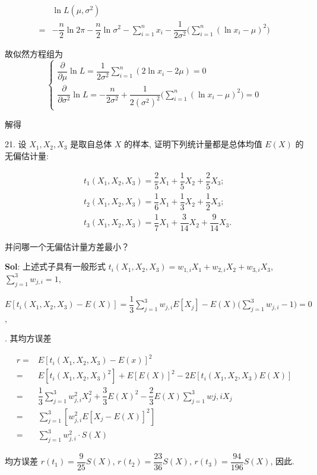 $$
\begin{aligned}
    &\ln L(\mu,\sigma^2)\\
    =&-\dfrac{n}{2}\ln2\pi-\dfrac{n}{2}\ln\sigma^2-\sum_{i=1}^nx_i-\dfrac{1}{2\sigma^2}\Big(\sum_{i=1}^n(\ln x_i-\mu)^2\Big)
\end{aligned}
$$

故似然方程组为
$$
\begin{cases}
\displaystyle
    \dfrac{\partial}{\partial \mu }\ln L=\dfrac{1}{2\sigma^2}\sum_{i=1}^n(2\ln x_i-2\mu)=0\\
\displaystyle
    \dfrac{\partial}{\partial \sigma^2}\ln L=-\dfrac{n}{2\sigma^2}+\dfrac{1}{2(\sigma^2)^2}\Big(\sum_{i=1}^n(\ln x_i-\mu)^2\Big)=0
\end{cases}
$$

解得 

\vspace{12pt}

21. 设 $X_1,X_2,X_3$ 是取自总体 $X$ 的样本, 证明下列统计量都是总体均值 $E(X)$ 的无偏估计量:

$$
\begin{aligned}
    &t_1(X_1,X_2,X_3)=\dfrac{2}{5}X_1+\dfrac{1}{5}X_2+\dfrac{2}{5}X_3;\\
    &t_2(X_1,X_2,X_3)=\dfrac{1}{6}X_1+\dfrac{1}{3}X_2+\dfrac{1}{2}X_3;\\
    &t_3(X_1,X_2,X_3)=\dfrac{1}{7}X_1+\dfrac{3}{14}X_2+\dfrac{9}{14}X_3.
\end{aligned}
$$

并问哪一个无偏估计量方差最小？

\textbf{Sol}: 上述式子具有一般形式 $t_i(X_1,X_2,X_3)=w_{1,i}X_1+w_{2,i}X_2+w_{3,i}X_3$, $\sum_{j=1}^3w_{j,i}=1$,  

$E[t_i(X_1,X_2,X_3)-E(X)]=\dfrac{1}{3}\sum_{j=1}^3w_{j,i}E[X_j]-E(X)\Big(\sum_{j=1}^3w_{j,i}-1\Big)=0$,

. 其均方误差

$$
\begin{aligned}
    r
    =&E[t_i(X_1,X_2,X_3)-E(x)]^2\\
    =&E[t_i(X_1,X_2,X_3)^2]+E[E(X)]^2-2E[t_i(X_1,X_2,X_3)E(X)]\\
    =&\dfrac{1}{3}\sum_{j=1}^3w_{j,i}^2X_{j}^2+\dfrac{3}{3}E(X)^2-\dfrac{2}{3}E(X)\sum_{j=1}^3w{j,i}X_j\\
    =&\sum_{j=1}^3[w_{j,i}^2E[X_j-E(X)]^2]\\
    =&\sum_{j=1}^3w_{j,i}^2\cdot S(X)
\end{aligned}
$$

均方误差 $r(t_1)=\dfrac{9}{25}S(X)$, $r(t_2)=\dfrac{23}{36}S(X)$, $r(t_3)=\dfrac{94}{196}S(X)$, 因此.
\vspace{12pt}



